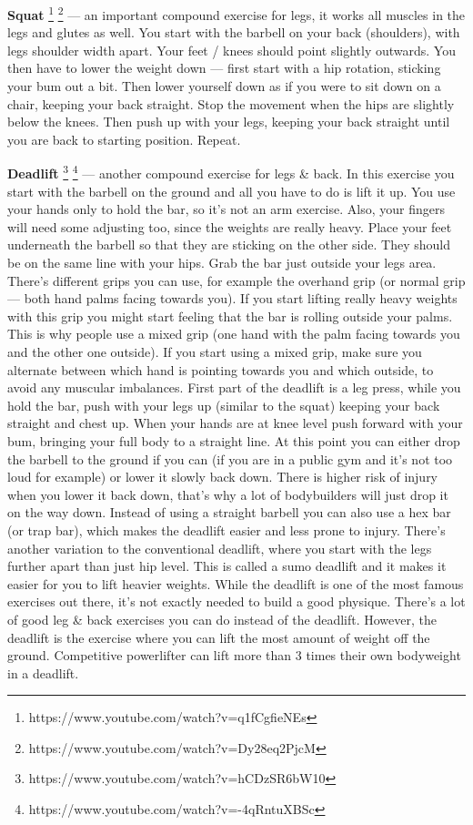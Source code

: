 \documentclass[openany, 12pt]{book}
\begin{document}
        \textbf{Squat}
        \footnote{https://www.youtube.com/watch?v=q1fCgfieNEs}
        \footnote{https://www.youtube.com/watch?v=Dy28eq2PjcM}
        --- an important compound exercise for legs, it works all muscles in the legs and glutes as well. You start with the barbell on your back (shoulders), with legs shoulder width apart.
        Your feet / knees should point slightly outwards.
        You then have to lower the weight down --- first start with a hip rotation, sticking your bum out a bit. Then lower yourself down as if you were to sit down on a chair, keeping your
        back straight. Stop the movement when the hips are slightly below the knees. Then push up with your legs, keeping your back straight until you are back to starting position. Repeat.

        \textbf{Deadlift}
        \footnote{https://www.youtube.com/watch?v=hCDzSR6bW10}
        \footnote{https://www.youtube.com/watch?v=-4qRntuXBSc}
        --- another compound exercise for legs \& back. In this exercise you start with the barbell on the ground and all you have to do is lift it up.
        You use your hands only to hold the bar, so it's not an arm exercise. Also, your fingers will need some adjusting too, since the weights are really heavy.
        Place your feet underneath the barbell so that they are sticking on the other side. They should be on the same line with your hips. Grab the bar just outside your legs area. 
        There's different grips you can use, for example the overhand grip (or normal grip --- both hand palms facing towards you).
        If you start lifting really heavy weights with this grip you might start feeling that the
        bar is rolling outside your palms. This is why people use a mixed grip (one hand with the palm facing towards you and the other one outside). If you start using a mixed grip,
        make sure you alternate between which hand is pointing towards you and which outside, to avoid any muscular imbalances.
        First part of the deadlift is a leg press, while you hold the bar, push with your legs up (similar to the squat) keeping your back straight and chest up. When your hands are at knee level
        push forward with your bum, bringing your full body to a straight line. At this point you can either drop the barbell to the ground if you can (if you are in a public gym and it's not too loud
        for example) or lower it slowly back down. There is higher risk of injury when you lower it back down, that's why a lot of bodybuilders will just drop it on the way down.
        Instead of using a straight barbell you can also use a hex bar (or trap bar), which makes the deadlift easier and less prone to injury. There's another variation to the conventional deadlift,
        where you start with the legs further apart than just hip level. This is called a sumo deadlift and it makes it easier for you to lift heavier weights.
        While the deadlift is one of the most famous exercises out there, it's not exactly needed to build a good physique. There's a lot of good leg \& back exercises you can do instead
        of the deadlift. However, the deadlift is the exercise where you can lift the most amount of weight off the ground. Competitive powerlifter can lift more than 3 times their own bodyweight in a
        deadlift.
\end{document}

